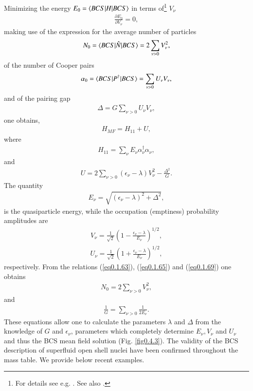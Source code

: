 Minimizing the energy $E_0=\langle {BCS|H|BCS} \rangle$ in terms of\footnote{For details see e.g. \cite{Ragnarsson:05}. See also \cite{Nathan:65}.} $V_\nu$
\begin{align}\label{eq0.1.62}
\frac{\partial E_0}{\partial V_\nu}=0,
\end{align}
 making use of the expression for the average number of particles
\begin{align}\label{eq0.1.63}
N_0=\langle {BCS|\hat N|BCS} \rangle=2\sum_{\nu>0}V_\nu^2,
\end{align}
 of the number of Cooper pairs
\begin{align}\label{eq0.1.64}
\alpha_0=\langle {BCS|P^\dagger|BCS} \rangle=\sum_{\nu>0}U_\nu V_\nu,
\end{align}
and of the pairing gap
\begin{align}\label{eq0.1.65}
\Delta=G\sum_{\nu>0}U_\nu V_{\nu},
\end{align}
one obtains,
\begin{align}\label{eq0.1.66}
H_{MF}=H_{11}+U,
\end{align}
where 
\begin{align}\label{eq0.1.67}
H_{11}=\sum_\nu E_\nu \alpha^\dagger_\nu\alpha_\nu,
\end{align}
and
\begin{align}\label{eq0.1.68}
U=2\sum_{\nu>0}(\epsilon_\nu-\lambda)V^2_\nu-\frac{\Delta^2}{G}.
\end{align}
The quantity
\begin{align}\label{eq0.1.69}
E_\nu=\sqrt{(\epsilon_\nu-\lambda)^2+\Delta^2},
\end{align}
is the quasiparticle energy, while the occupation (emptiness) probability amplitudes are
\begin{align}\label{eq0.1.70}
V_\nu=\frac{1}{\sqrt{2}}\left(1-\frac{\epsilon_\nu-\lambda}{E_\nu}\right)^{1/2},
\end{align}
\begin{align}\label{eq0.1.71}
U_\nu=\frac{1}{\sqrt{2}}\left(1+\frac{\epsilon_\nu-\lambda}{E_\nu}\right)^{1/2},
\end{align}
 respectively. From the relations (\ref{eq0.1.63}),  (\ref{eq0.1.65}) and (\ref{eq0.1.69}) one obtains
\begin{align}\label{eq0.1.72}
N_0=2\sum_{\nu>0}V^2_\nu,
\end{align}
 and 
\begin{align}\label{eq0.1.73}
\frac{1}{G}=\sum_{\nu>0}\frac{1}{2E_\nu}.
\end{align}
These equations allow one to calculate the parameters $\lambda$ and $\Delta$ from the knowledge of $G$ and $\epsilon_\nu$, parameters which completely determine $E_\nu,V_\nu$ and $U_\nu$ and thus the BCS mean field solution (Fig. \ref{fig0.4.3}). The validity of the BCS description of superfluid open shell nuclei have been confirmed throughout the mass table. We provide below recent examples.

